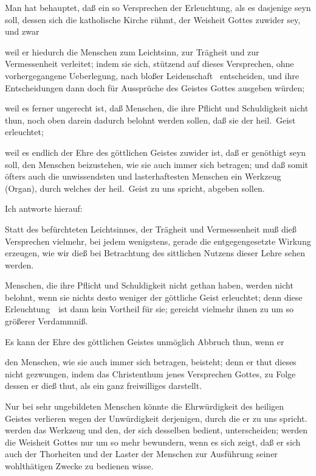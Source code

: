 \begin{aufza}
\item Man hat behauptet, daß ein so  Versprechen der Erleuchtung, als es dasjenige seyn soll, dessen sich die katholische Kirche rühmt, der Weisheit Gottes zuwider sey, und zwar
\begin{aufzb}
\item weil er hiedurch die Menschen zum Leichtsinn, zur Trägheit und zur Vermessenheit verleitet; indem sie sich, stützend auf dieses Versprechen, ohne vorhergegangene Ueberlegung, nach bloßer Leidenschaft \udgl\  entscheiden, und ihre Entscheidungen dann doch für Aussprüche des Geistes Gottes ausgeben würden;
\item weil es ferner ungerecht ist, daß Menschen, die ihre Pflicht und Schuldigkeit nicht thun, noch oben darein dadurch belohnt werden sollen, daß sie der heil.\ Geist erleuchtet;
\item weil es endlich der Ehre des göttlichen Geistes zuwider ist, daß er genöthigt seyn soll, den Menschen beizustehen, wie sie auch immer sich betragen; und daß somit öfters auch die unwissendsten und lasterhaftesten Menschen ein Werkzeug (Organ), durch welches der heil.\ Geist zu uns spricht, abgeben sollen.
\end{aufzb}
\item Ich antworte hierauf:
\begin{aufzb}
\item Statt des befürchteten Leichtsinnes, der Trägheit und Vermessenheit muß dieß Versprechen vielmehr, bei jedem  wenigstens, gerade die entgegengesetzte Wirkung erzeugen, wie wir dieß bei Betrachtung des sittlichen Nutzens dieser Lehre sehen werden.
\item Menschen, die ihre Pflicht und Schuldigkeit nicht gethan haben, werden nicht belohnt, wenn sie nichts desto weniger der göttliche Geist erleuchtet; denn diese Erleuchtung~\ ist dann kein Vortheil für sie; gereicht vielmehr ihnen zu um so größerer Verdammniß.
\item Es kann der Ehre des göttlichen Geistes unmöglich Abbruch thun, wenn er
\begin{aufzc}
\item den Menschen, wie sie auch immer sich betragen, beisteht; denn er thut dieses nicht gezwungen, indem das Christenthum jenes Versprechen Gottes, zu Folge dessen er dieß thut, als ein ganz freiwilliges darstellt.
\item Nur bei sehr ungebildeten Menschen könnte die Ehrwürdigkeit des heiligen Geistes verlieren wegen der Unwürdigkeit derjenigen, durch die er zu uns spricht.  werden das Werkzeug und den, der sich desselben bedient, unterscheiden; werden die Weisheit Gottes nur um so mehr bewundern, wenn es sich zeigt, daß er sich auch der Thorheiten und der Laster der Menschen zur Ausführung seiner wohlthätigen Zwecke zu bedienen wisse.
\end{aufzc}
\end{aufzb}
\end{aufza}


